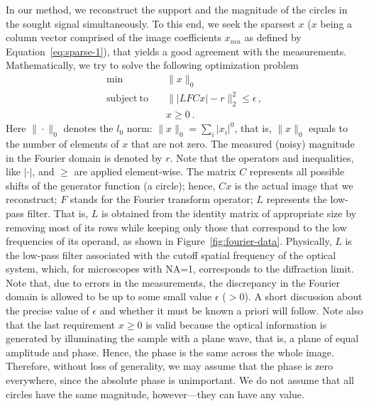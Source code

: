 In our method, we reconstruct the support and the magnitude of the
circles in the sought signal simultaneously. To this end, we seek
the sparsest $x$ ($x$ being a column vector comprised of the
image coefficients $x_{mn}$ as defined by Equation~\eqref{eq:sparse-1}), that
yields a good agreement with the measurements. Mathematically, we
try to solve the following optimization problem
\begin{equation}
  \label{eq:sparse-2}
  \begin{split}
    \min &\quad\|x\|_{0}\\
    \mathrm{subject\ to} &\quad \||LFCx| - r\|_{2}^{2}\leq\epsilon\, , \\
    &\quad x \geq 0\ .
  \end{split}
\end{equation}
Here $\|\cdot\|_{0}$ denotes the $l_{0}$ norm: $\|x\|_{0} =
\sum_{i}|x_{i}|^{0}$,  that is, $\|x\|_{0}$
equals to the number of elements of $x$ that are not zero. The
measured (noisy) magnitude in the Fourier domain is denoted by
$r$. Note that the operators and inequalities, like $|\cdot|$, and
$\geq$ are applied element-wise. The matrix $C$ represents all
possible shifts of the generator function (a circle); hence, $Cx$ is
the actual image that we reconstruct; $F$ stands for the Fourier
transform operator; $L$ represents the low-pass filter. That is, $L$
is obtained from the identity matrix of appropriate size by removing
most of its rows while keeping only those that correspond to the low
frequencies of its operand, as shown in
Figure~\ref{fig:fourier-data}. Physically, $L$ is the low-pass filter
associated with the cutoff spatial frequency of the optical system,
which, for microscopes with NA=1, corresponds to the diffraction
limit. Note that, due to errors in the
measurements, the discrepancy in the Fourier domain is allowed to be
up to some small value $\epsilon $ ($>0$). A short discussion about the precise value of
$\epsilon$ and whether it must be known a priori will follow. Note
also that the last requirement $x\geq 0$ is valid because the optical
information is generated by illuminating the sample with a plane wave,
that is, a plane of equal amplitude and phase. Hence, the
phase is the same across the whole image. Therefore, without loss of
generality, we may assume that the phase is zero everywhere, since the
absolute phase is unimportant. We do not
assume that all circles have the same magnitude, however---they can
have any value.


